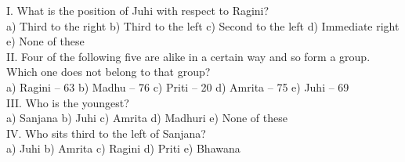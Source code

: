 \documentclass[
]{article}
\begin{document}
I. What is the position of Juhi with respect to Ragini?\\
a) Third to the right \hspace{2mm}b) Third to the left \hspace{2mm}c) Second to the left \hspace{2mm}d) Immediate right \hspace{2mm}e) None of these\\

II. Four of the following five are alike in a certain way and so form a group. Which one does
not belong to that group?\\
a) Ragini – 63 \hspace{2mm}b) Madhu – 76 \hspace{2mm}c) Priti – 20 \hspace{2mm}d) Amrita – 75 \hspace{2mm}e) Juhi – 69\\

III. Who is the youngest?\\
a) Sanjana \hspace{2mm}b) Juhi \hspace{2mm}c) Amrita \hspace{2mm}d) Madhuri \hspace{2mm}e) None of these\\

IV. Who sits third to the left of Sanjana?\\
a) Juhi \hspace{2mm}b) Amrita \hspace{2mm}c) Ragini \hspace{2mm}d) Priti \hspace{2mm}e) Bhawana\\
\end{document}
